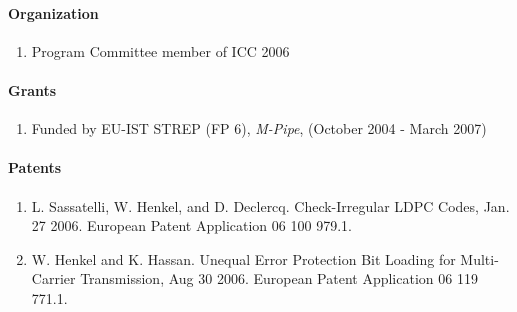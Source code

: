 \newpage
\paragraph{Organization}

\begin{enumerate}
\item Program Committee member of ICC 2006
\end{enumerate}


\paragraph{Grants}
\begin{enumerate}
\item Funded by EU-IST STREP (FP 6), \emph{M-Pipe}, (October 2004
- March 2007)
\end{enumerate}

\paragraph{Patents}
\begin{enumerate}
\item  L. Sassatelli, W. Henkel, and D. Declercq. Check-Irregular LDPC Codes, Jan. 27
  2006. European Patent Application 06 100 979.1.
\item W. Henkel and K. Hassan. Unequal Error Protection Bit Loading for Multi-Carrier
  Transmission, Aug 30 2006. European Patent Application 06 119 771.1.
\end{enumerate}



